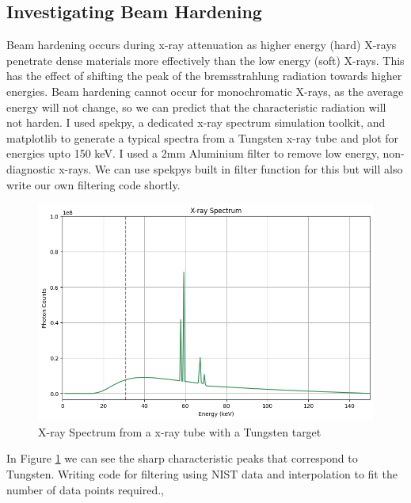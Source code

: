 \documentclass{article}
\begin{document}
\subsection{Investigating Beam Hardening}
Beam hardening occurs during x-ray attenuation as higher energy (hard) X-rays penetrate dense materials more effectively than the low energy (soft) X-rays. This has the effect of shifting the peak of the bremsstrahlung radiation towards higher energies. Beam hardening cannot occur for monochromatic X-rays, as the average energy will not change, so we can predict that the characteristic radiation will not harden.
I used spekpy, a dedicated x-ray spectrum simulation toolkit, and matplotlib to generate a typical spectra from a Tungsten x-ray tube and plot for energies upto 150 keV. I used a 2mm Aluminium filter to remove low energy, non-diagnostic x-rays. We can use spekpys built in filter function for this but will also write our own filtering code shortly.

\begin{figure}
	\includegraphics[width=\linewidth]{typicalxrayspectra.png}
	\caption{X-ray Spectrum from a x-ray tube with a Tungsten target}
  \label{fig:basespectra}
\end{figure}

In Figure \ref{fig:basespectra} we can see the sharp characteristic peaks that correspond to Tungsten. Writing code for filtering using NIST data and interpolation to fit the number of data points required., 
\end{document}
